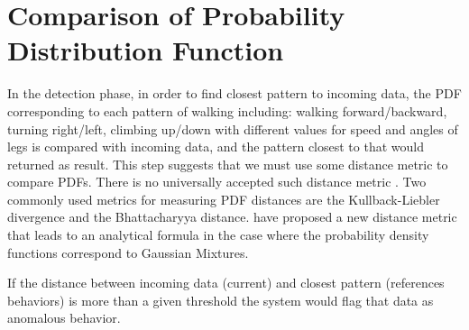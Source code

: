 \documentclass{article}
\begin{document}
%


\section{Comparison of Probability Distribution Function}\label{Comparison_of_Probability_Distribution_Function}
In the detection phase, in order to find closest pattern to incoming data, the PDF corresponding to each pattern of walking including: walking forward/backward, turning right/left, climbing up/down with different values for speed and angles of legs is compared with incoming data, and the pattern closest to  that would returned as result. This step suggests that we must use some distance metric to compare PDFs. There is no universally accepted such distance metric \cite{Introduction_to_Statistical_Pattern_Recognition}. Two commonly used metrics for measuring PDF distances are the Kullback-Liebler divergence and the Bhattacharyya distance.
\citet{An_Analytic_Distance_Metric_for_Gaussian_Mixture_Models} have proposed a new 
 distance metric that leads to an analytical formula in the case where the
probability density functions correspond to Gaussian Mixtures.

If the distance between incoming data (current) and closest pattern (references behaviors) is more than a given threshold the system would flag that data as anomalous behavior.
\end{document}
